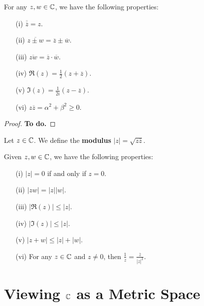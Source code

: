 \documentclass[a4paper]{article}
\begin{document}
\begin{prop}
    For any \( z,w \in \mathbb{C}  \), we have the following properties:
   \begin{enumerate}
       \item[(i)] \( \overline{\overline{z}} = z  \).
        \item[(ii)] \( \overline{z \pm w} = \overline{z} \pm \overline{w} \). 
        \item[(iii)] \( \overline{zw} = \overline{z} \cdot \overline{w} \).
        \item[(iv)] \( \Re(z) = \frac{ 1 }{ 2 }  ( z + \overline{z}) \).
        \item[(v)] \( \Im(z) = \frac{ 1 }{ 2i } (z - \overline{z}) \). 
        \item[(vi)] \( z \overline{z} = \alpha^{2} + \beta^{2} \geq 0 \).
   \end{enumerate} 
\end{prop}
\begin{proof}
\textbf{To do.}
\end{proof}

\begin{definition}
   Let \( z \in \mathbb{C}  \). We define the \textbf{modulus} \( | z  |  = \sqrt{ z \overline{z} }  \).
\end{definition}


\begin{prop}
   Given \( z,w \in \mathbb{C}  \), we have the following properties:
   \begin{enumerate}
       \item[(i)] \( | z  |  = 0  \) if and only if \( z = 0  \).
        \item[(ii)] \( | zw  |  = | z  | | w |  \).
        \item[(iii)] \( | \Re(z) |  \leq | z  |  \).
        \item[(iv)] \( | \Im(z) | \leq | z |  \).
        \item[(v)] \( | z + w  | \leq | z  |  + | w |  \).
        \item[(vi)] For any \( z \in \mathbb{C}  \) and \( z \neq 0  \), then
            \(  \frac{ 1 }{ z }  = \frac{ \overline{z} }{ | z |^{2} }. \)
   \end{enumerate}
\end{prop}

\section{Viewing \( \mathbb{C}  \) as a Metric Space}
\end{document}
